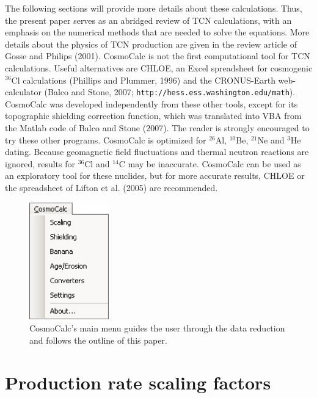 \documentclass{article}
\begin{document}
The  following   sections  will  provide  more   details  about  these
calculations.  Thus, the present paper serves as an abridged review of
TCN calculations, with  an emphasis on the numerical  methods that are
needed to solve the equations.   More details about the physics of TCN
production  are given  in  the  review article  of  Gosse and  Philips
(2001).   CosmoCalc  is  not  the  first computational  tool  for  TCN
calculations.  Useful alternatives are CHLOE, an Excel spreadsheet for
cosmogenic $^{36}$Cl calculations (Phillips and Plummer, 1996) and the
CRONUS-Earth     web-calculator     (Balco     and    Stone,     2007;
\texttt{http://hess.ess.washington.edu/math}).       CosmoCalc     was
developed  independently  from  these  other  tools,  except  for  its
topographic shielding  correction function, which  was translated into
VBA from  the Matlab code  of Balco and  Stone (2007).  The  reader is
strongly  encouraged  to  try  these  other  programs.   CosmoCalc  is
optimized  for $^{26}$Al,  $^{10}$Be, $^{21}$Ne  and $^{3}$He  dating. 
Because geomagnetic  field fluctuations and  thermal neutron reactions
are ignored,  results for  $^{36}$Cl and $^{14}$C  may be  inaccurate. 
CosmoCalc can be  used as an exploratory tool  for these nuclides, but
for more accurate  results, CHLOE or the spreadsheet of  Lifton et al. 
(2005) are recommended.

\begin{figure}[][h]
  \centering
  \includegraphics[height=2in]{2006GC001530-f01_orig.jpg}
  \caption{CosmoCalc's main menu guides the user through
    the data reduction and follows the outline of this paper.}
  \label{fig:CosmoMenu}
\end{figure}

\section{Production rate scaling factors}\label{sec:scaling}
\end{document}
